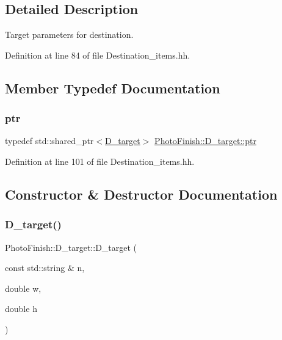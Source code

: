 \subsection{Detailed Description}
Target parameters for destination. 

Definition at line 84 of file Destination\+\_\+items.\+hh.



\subsection{Member Typedef Documentation}
\mbox{\label{class_photo_finish_1_1_d__target_a44befb9c758d25b0c765e97caa1caa39}} 
\subsubsection{\texorpdfstring{ptr}{ptr}}
{\footnotesize\ttfamily typedef std\+::shared\+\_\+ptr$<$\hyperlink{class_photo_finish_1_1_d__target}{D\+\_\+target}$>$ \hyperlink{class_photo_finish_1_1_d__target_a44befb9c758d25b0c765e97caa1caa39}{Photo\+Finish\+::\+D\+\_\+target\+::ptr}}



Definition at line 101 of file Destination\+\_\+items.\+hh.



\subsection{Constructor \& Destructor Documentation}
\mbox{\label{class_photo_finish_1_1_d__target_aa83bf826478d54de26ca1abad6988a7c}} 
\subsubsection{\texorpdfstring{D\+\_\+target()}{D\_target()}\hspace{0.1cm}{\footnotesize\ttfamily [1/2]}}
{\footnotesize\ttfamily Photo\+Finish\+::\+D\+\_\+target\+::\+D\+\_\+target (\begin{DoxyParamCaption}\item[{const std\+::string \&}]{n,  }\item[{double}]{w,  }\item[{double}]{h }\end{DoxyParamCaption})}



